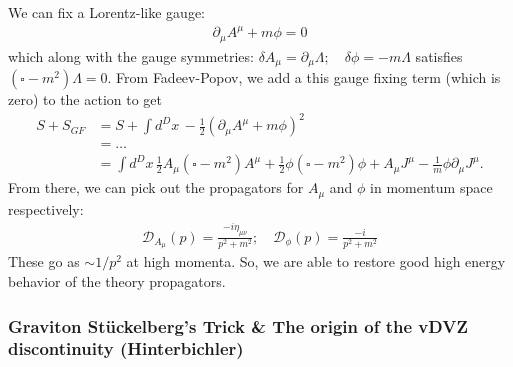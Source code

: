 \documentclass{book}
\theoremstyle{definition}
\newcommand{\p}{\partial}
\newcommand{\nn}{\nonumber}
\newcommand{\f}[2]{\frac{#1}{#2}}
\newcommand{\lp}{\left(}
\newcommand{\rp}{\right)}
\newcommand{\D}{\mathcal{D}}
\begin{document}
We can fix a Lorentz-like gauge:
\begin{align}
\p_\mu A^\mu + m\phi = 0
\end{align}
which along with the gauge symmetries: $\delta A_\mu = \p_\mu \Lambda; \quad \delta \phi = -m\Lambda$ satisfies $(\square - m^2)\Lambda = 0$. From Fadeev-Popov, we add a this gauge fixing term (which is zero) to the action to get
\begin{align}
S+ S_{GF} &= S + \int d^Dx\, -\f{1}{2}\lp \p_\mu A^\mu + m\phi \rp^2\nn\\
&= \dots\nn\\
&= \int d^Dx\, \f{1}{2}A_\mu (\square - m^2)A^\mu + \f{1}{2}\phi(\square - m^2)\phi + A_\mu J^\mu - \f{1}{m}\phi \p_\mu J^\mu.
\end{align} 
From there, we can pick out the propagators for $A_\mu$ and $\phi$ in momentum space respectively:
\begin{align}
\boxed{\D_{A_\mu}(p) = \f{-i\eta_{\mu\nu}}{p^2 + m^2}; \quad \D_{\phi}(p) = \f{-i}{p^2 + m^2}}
\end{align}
These go as $\sim 1/p^2$ at high momenta. So, we are able to restore good high energy behavior of the theory propagators. 
























\subsubsection{Graviton St\"{u}ckelberg's Trick \& The origin of the vDVZ discontinuity (Hinterbichler)}
\end{document}
